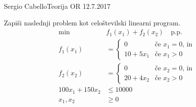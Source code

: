 \begin{naloga}{Sergio Cabello}{Teorija OR 12.7.2017}
\begin{vprasanje}
Zapiši naslednji problem kot celoštevilski linearni program.
\begin{align*}
\min & f_1(x_1) + f_2(x_2) \quad \text{p.p.} \\
f_1(x_1) &= \begin{cases}
            0         & \text{če $x_1 = 0$, in} \\
            10 + 5x_1 & \text{če $x_1 > 0$}
            \end{cases} \\
f_2(x_2) &= \begin{cases}
            0         & \text{če $x_2 = 0$, in} \\
            20 + 4x_2 & \text{če $x_2 > 0$}
            \end{cases} \\
100x_1 + 150x_2 &\le 10000 \\
x_1, x_2 &\ge 0
\end{align*}
\end{vprasanje}
\begin{odgovor}
\end{odgovor}
\end{naloga}
